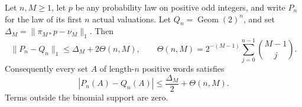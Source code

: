 \begin{proposition}
\label{prop:Mazur-truncation-transport}
Let $n,M\ge1$, let $p$ be any probability law on positive odd
integers, and write $P_n$ for the law of its first $n$ actual valuations.
Let $Q_n=\operatorname{Geom}(2)^n$, and set
$\Delta_M=\|\pi_{M*}p-\nu_M\|_1$.
Then
\begin{equation}
 \|P_n-Q_n\|_1\le\Delta_M+2\Theta(n,M),\qquad
 \Theta(n,M)=2^{-(M-1)}
       \sum_{j=0}^{n-1}\binom{M-1}{j}.
 \label{eq:Mazur-truncation-transport}
\end{equation}
Consequently every set $A$ of length-$n$ positive words satisfies
\begin{equation}
 |P_n(A)-Q_n(A)|\le\frac{\Delta_M}{2}+\Theta(n,M).
 \label{eq:Mazur-event-half}
\end{equation}
Terms outside the binomial support are zero.
\end{proposition}
